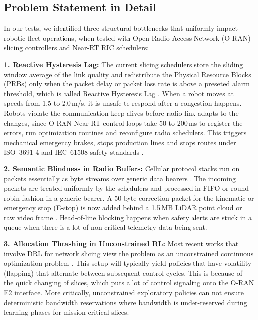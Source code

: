 \documentclass[twocolumn,10pt,twoside]{article}
\begin{document}
\subsection{Problem Statement in Detail}
In our tests, we identified three structural bottlenecks that uniformly impact robotic fleet operations, when tested with Open Radio Access Network (O-RAN) slicing controllers and Near-RT RIC schedulers:

\textbf{1. Reactive Hysteresis Lag:} The current slicing schedulers store the sliding window average of the link quality and redistribute the Physical Resource Blocks (PRBs) only when the packet delay or packet loss rate is above a preseted alarm threshold, which is called Reactive Hysteresis Lag \cite{qazzaz2026oreo, yungaicela2026rslaq}. When a robot moves at speeds from 1.5 to 2.0\,m/s, it is unsafe to respond after a congestion happens. Robots violate the communication keep-alives before radio link adapts to the changes, since O-RAN Near-RT control loops take 50 to 200\,ms to register the errors, run optimization routines and reconfigure radio schedulers. This triggers mechanical emergency brakes, stops production lines and stops routes under ISO~3691-4 and IEC~61508 safety standards \cite{iso3691_4, iec61508}.

\textbf{2. Semantic Blindness in Radio Buffers:} Cellular protocol stacks run on packets essentially as byte streams over generic data bearers \cite{popovski2020semantic, semantic2026generative}. The incoming packets are treated uniformly by the schedulers and processed in FIFO or round robin fashion in a generic bearer. A 50-byte correction packet for the kinematic or emergency stop (E-stop) is now added behind a 1.5\,MB LiDAR point cloud or raw video frame \cite{slot2026semantic, mamba2026semantic}. Head-of-line blocking happens when safety alerts are stuck in a queue when there is a lot of non-critical telemetry data being sent.

\textbf{3. Allocation Thrashing in Unconstrained RL:} Most recent works that involve DRL for network slicing view the problem as an unconstrained continuous optimization problem \cite{monaco2026crown, ali2026aidriven}. This setup will typically yield policies that have volatility (flapping) that alternate between subsequent control cycles. This is because of the quick changing of slices, which puts a lot of control signaling onto the O-RAN E2 interface. More critically, unconstrained exploratory policies can not ensure deterministic bandwidth reservations \cite{iec61508} where bandwidth is under-reserved during learning phases for mission critical slices.
\end{document}
